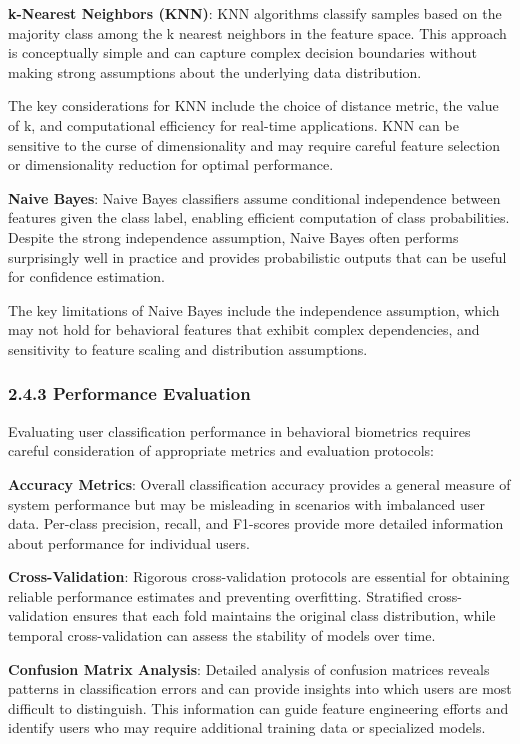 \documentclass[
  11pt,
  a4paper,
]{article}
\begin{document}
\textbf{k-Nearest Neighbors (KNN)}: KNN algorithms classify samples
based on the majority class among the k nearest neighbors in the feature
space. This approach is conceptually simple and can capture complex
decision boundaries without making strong assumptions about the
underlying data distribution.

The key considerations for KNN include the choice of distance metric,
the value of k, and computational efficiency for real-time applications.
KNN can be sensitive to the curse of dimensionality and may require
careful feature selection or dimensionality reduction for optimal
performance.

\textbf{Naive Bayes}: Naive Bayes classifiers assume conditional
independence between features given the class label, enabling efficient
computation of class probabilities. Despite the strong independence
assumption, Naive Bayes often performs surprisingly well in practice and
provides probabilistic outputs that can be useful for confidence
estimation.

The key limitations of Naive Bayes include the independence assumption,
which may not hold for behavioral features that exhibit complex
dependencies, and sensitivity to feature scaling and distribution
assumptions.

\subsubsection{2.4.3 Performance
Evaluation}\label{performance-evaluation}

Evaluating user classification performance in behavioral biometrics
requires careful consideration of appropriate metrics and evaluation
protocols:

\textbf{Accuracy Metrics}: Overall classification accuracy provides a
general measure of system performance but may be misleading in scenarios
with imbalanced user data. Per-class precision, recall, and F1-scores
provide more detailed information about performance for individual
users.

\textbf{Cross-Validation}: Rigorous cross-validation protocols are
essential for obtaining reliable performance estimates and preventing
overfitting. Stratified cross-validation ensures that each fold
maintains the original class distribution, while temporal
cross-validation can assess the stability of models over time.

\textbf{Confusion Matrix Analysis}: Detailed analysis of confusion
matrices reveals patterns in classification errors and can provide
insights into which users are most difficult to distinguish. This
information can guide feature engineering efforts and identify users who
may require additional training data or specialized models.
\end{document}
